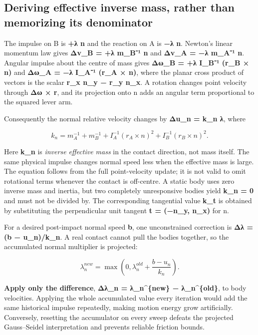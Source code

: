 \subsection{Deriving effective inverse mass, rather than memorizing its denominator}\label{appendix-c9d92e145503-deriving-effective-inverse-mass-rather-than-memorizing-its-denominator}

\hypertarget{appendix-c9d92e145503-deriving-effective-inverse-mass-rather-than-memorizing-its-denominator}{}

The impulse on B is \textbf{+λ n} and the reaction on A is \textbf{−λ n}. Newton's linear momentum law gives \textbf{Δv\_B = +λ m\_B⁻¹ n} and \textbf{Δv\_A = −λ m\_A⁻¹ n}. Angular impulse about the centre of mass gives \textbf{Δω\_B = +λ I\_B⁻¹ (r\_B × n)} and \textbf{Δω\_A = −λ I\_A⁻¹ (r\_A × n)}, where the planar cross product of vectors is the scalar \textbf{r\_x n\_y − r\_y n\_x}. A rotation changes point velocity through \textbf{Δω × r}, and its projection onto n adds an angular term proportional to the squared lever arm.

Consequently the normal relative velocity changes by \textbf{Δu\_n = k\_n λ}, where

\[
k_n = m_A^{-1} + m_B^{-1}
    + I_A^{-1}(r_A \times n)^2
    + I_B^{-1}(r_B \times n)^2.
\]

Here \textbf{k\_n} is \emph{inverse effective mass} in the contact direction, not mass itself. The same physical impulse changes normal speed less when the effective mass is large. The equation follows from the full point-velocity update; it is not valid to omit rotational terms whenever the contact is off-centre. A static body uses zero inverse mass and inertia, but two completely unresponsive bodies yield \textbf{k\_n = 0} and must not be divided by. The corresponding tangential value \textbf{k\_t} is obtained by substituting the perpendicular unit tangent \textbf{t = (−n\_y, n\_x)} for n.

For a desired post-impact normal speed \textbf{b}, one unconstrained correction is \textbf{Δλ = (b − u\_n)/k\_n}. A real contact cannot pull the bodies together, so the accumulated normal multiplier is projected:

\[
\lambda_n^{new}=\max\left(0,\lambda_n^{old}
 + \frac{b-u_n}{k_n}\right).
\]

\textbf{Apply only the difference}, \textbf{Δλ\_n = λ\_n\^{}\{new\} − λ\_n\^{}\{old\}}, to body velocities. Applying the whole accumulated value every iteration would add the same historical impulse repeatedly, making motion energy grow artificially. Conversely, resetting the accumulator on every sweep defeats the projected Gauss--Seidel interpretation and prevents reliable friction bounds.


